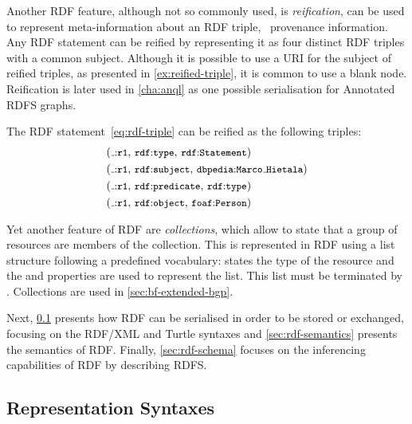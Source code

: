 Another \ac{RDF} feature, although not so commonly used, is \emph{reification}, can be used to represent
meta-information about an \ac{RDF} triple, \eg~provenance information.  Any \ac{RDF} statement can be reified by
representing it as four distinct \ac{RDF} triples with a common subject.  Although it is possible to use a \ac{URI} for
the subject of reified triples, as presented in \cref{ex:reified-triple}, it is common to use a blank node.
%
Reification is later used in \cref{cha:anql} as one possible serialisation for Annotated RDFS graphs.
%
\begin{example}
  \label{ex:reified-triple}
  The \ac{RDF} statement~\eqref{eq:rdf-triple} can be reified as the following triples:
  \vspace{-\abovedisplayskip}
  \begin{align*}
    &\triplee{\bnode{r1}}{\qname{rdf}{type}}{\qname{rdf}{Statement}}\\
    &\triplee{\bnode{r1}}{\qname{rdf}{subject}}{\qname{dbpedia}{Marco\mathunderscore{}Hietala}}\\
    &\triplee{\bnode{r1}}{\qname{rdf}{predicate}}{\qname{rdf}{type}}\\
    &\triplee{\bnode{r1}}{\qname{rdf}{object}}{\qname{foaf}{Person}}
  \end{align*}
\end{example}


Yet another feature of \ac{RDF} are \emph{collections}, which allow to state that a group of resources are members of
the collection.  This is represented in \ac{RDF} using a list structure following a predefined vocabulary:
 states the type of the resource and the  and  properties are used
to represent the list.  This list must be terminated by .  Collections are used in
\cref{sec:bf-extended-bgp}.

\medskip

Next, \cref{sec:representation-syntax} presents how \ac{RDF} can be serialised in order to be stored or
exchanged, focusing on the RDF/XML and Turtle syntaxes and \cref{sec:rdf-semantics} presents the semantics of
\ac{RDF}.  Finally, \cref{sec:rdf-schema} focuses on the inferencing capabilities of \ac{RDF} by describing
\acl{RDFS}.

\subsection{Representation Syntaxes}
\label{sec:representation-syntax}

